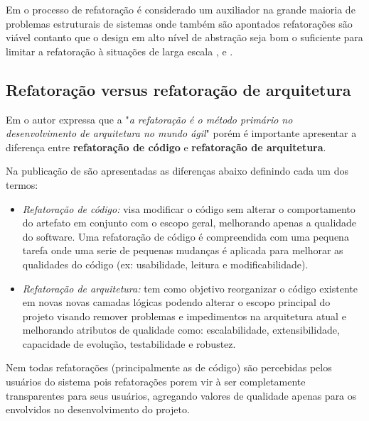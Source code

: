 Em \cite{babar2013agile} o processo de refatoração é considerado um auxiliador na grande maioria de problemas estruturais de sistemas onde também são apontados refatorações são viável contanto que o design em alto nível de abstração seja bom o suficiente para limitar a refatoração à situações de larga escala \cite{ihme2005agile}, \cite{kruchten2008situated} e \cite{boehm2002get}.

\subsection{Refatoração versus refatoração de arquitetura}
\label{ssec:codvsarq}

Em \cite{thapparambil2005agile} o autor expressa que a "\textit{a refatoração é o método primário no desenvolvimento de arquitetura no mundo ágil}" porém é importante apresentar a diferença entre \textbf{refatoração de código} e \textbf{refatoração de arquitetura}.

Na publicação de \cite{codevsarefactor} são apresentadas as diferenças abaixo definindo cada um dos termos:

\begin{itemize}
    \item \textit{Refatoração de código:} visa modificar o código sem alterar o comportamento do artefato em conjunto com o escopo geral, melhorando apenas a qualidade do software. Uma refatoração de código é compreendida com uma pequena tarefa onde uma serie de pequenas mudanças é aplicada para melhorar as qualidades do código (ex: usabilidade, leitura e modificabilidade).
    \item \textit{Refatoração de arquitetura:} tem como objetivo reorganizar o código existente em novas novas camadas lógicas podendo alterar o escopo principal do projeto visando remover problemas e impedimentos na arquitetura atual e melhorando atributos de qualidade como: escalabilidade, extensibilidade, capacidade de evolução, testabilidade e robustez. 
\end{itemize}

Nem todas refatorações (principalmente as de código) são percebidas pelos usuários do sistema pois refatorações porem vir à ser completamente transparentes para seus usuários, agregando valores de qualidade apenas para os envolvidos no desenvolvimento do projeto.